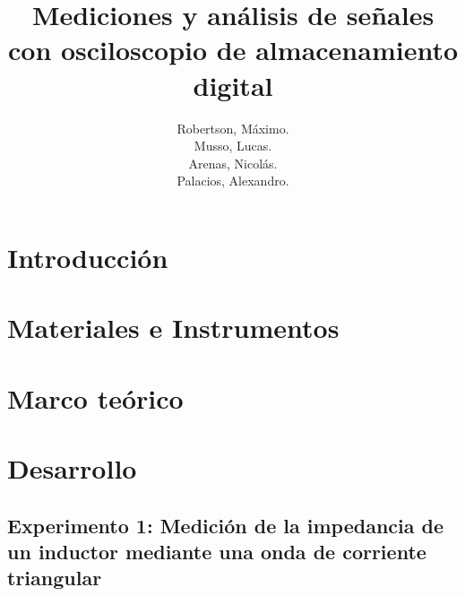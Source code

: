 

\title{Mediciones y análisis de señales con osciloscopio de almacenamiento digital}
\author{
    Robertson, Máximo. \par 
    Musso, Lucas.  \par 
    Arenas, Nicolás. \par 
    Palacios, Alexandro. \par 
}
\legajo{
    89712 \par 
    91934 \par 
    86607 \par 
    91454 \par
}



\maketitle

\tableofcontents
\newpage


\section{Introducción}


\newpage
\section{Materiales e Instrumentos}


\newpage
\section{Marco teórico}


\newpage
\section{Desarrollo}
\subsection{Experimento 1: Medición de la impedancia de un inductor mediante una onda de
corriente triangular}



